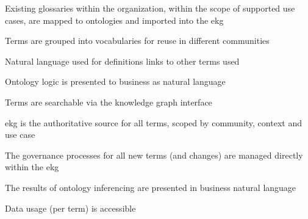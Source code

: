 \kgmmscoringlevelThree

\begin{scoring}

  \item Existing glossaries within the organization, within the scope of supported use cases,
        are mapped to ontologies and imported into the \gls{ekg}
  \item Terms are grouped into vocabularies for reuse in different communities
  \item Natural language used for definitions links to other terms used
  \item Ontology logic is presented to business as natural language
  \item Terms are searchable via the knowledge graph interface


\end{scoring}

\kgmmscoringlevelFour

\begin{scoring}

  \item \gls{ekg} is the authoritative source for all terms, scoped by community, context and use case
  \item The governance processes for all new terms (and changes) are managed directly within the \gls{ekg}
  \item The results of ontology inferencing are presented in business natural language
  \item Data usage (per term) is accessible


\end{scoring}

\kgmmscoringlevelFive

